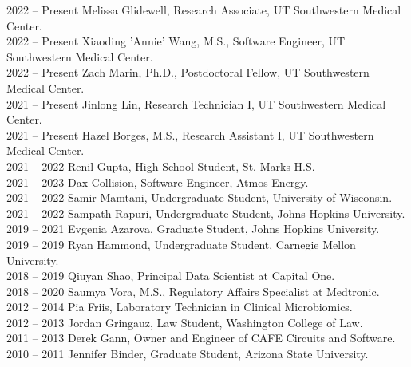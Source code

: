 2022 -- Present \hspace{14pt} Melissa Glidewell, Research Associate, UT Southwestern Medical Center. \\
2022 -- Present \hspace{14pt} Xiaoding 'Annie' Wang, M.S., Software Engineer, UT Southwestern Medical Center. \\
2022 -- Present \hspace{14pt} Zach Marin, Ph.D., Postdoctoral Fellow, UT Southwestern Medical Center. \\
2021 -- Present \hspace{14pt} Jinlong Lin, Research Technician I, UT Southwestern Medical Center. \\
2021 -- Present \hspace{14pt} Hazel Borges, M.S., Research Assistant I, UT Southwestern Medical Center. \\
2021 -- 2022 \hspace{28pt} Renil Gupta, High-School Student, St. Marks H.S. \\
2021 -- 2023 \hspace{28pt} Dax Collision, Software Engineer, Atmos Energy. \\
2021 -- 2022 \hspace{28pt} Samir Mamtani, Undergraduate Student, University of Wisconsin. \\
2021 -- 2022 \hspace{28pt} Sampath Rapuri, Undergraduate Student, Johns Hopkins University. \\
2019 -- 2021 \hspace{28pt} Evgenia Azarova, Graduate Student, Johns Hopkins University. \\
2019 -- 2019 \hspace{28pt} Ryan Hammond, Undergraduate Student, Carnegie Mellon University. \\
2018 -- 2019 \hspace{28pt} Qiuyan Shao, Principal Data Scientist at Capital One. \\
2018 -- 2020 \hspace{28pt} Saumya Vora, M.S., Regulatory Affairs Specialist at Medtronic. \\
2012 -- 2014 \hspace{28pt} Pia Friis,  Laboratory Technician in Clinical Microbiomics. \\
2012 -- 2013 \hspace{28pt} Jordan Gringauz, Law Student, Washington College of Law. \\
2011 -- 2013 \hspace{28pt} Derek Gann, Owner and Engineer of CAFE Circuits and Software. \\
2010 -- 2011 \hspace{28pt} Jennifer Binder, Graduate Student, Arizona State University.